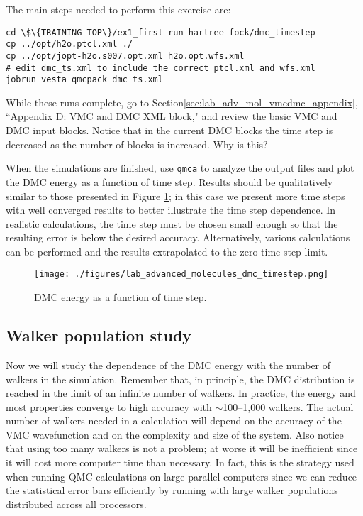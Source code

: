 The main steps needed to perform this exercise are:
\begin{lstlisting}[style=SHELL]
cd \$\{TRAINING TOP\}/ex1_first-run-hartree-fock/dmc_timestep
cp ../opt/h2o.ptcl.xml ./
cp ../opt/jopt-h2o.s007.opt.xml h2o.opt.wfs.xml
# edit dmc_ts.xml to include the correct ptcl.xml and wfs.xml
jobrun_vesta qmcpack dmc_ts.xml
\end{lstlisting}
While these runs complete, go to Section\ref{sec:lab_adv_mol_vmcdmc_appendix}, ``Appendix D: VMC and DMC XML block," and review the basic VMC and DMC input
blocks. Notice that in the current DMC blocks the time step is decreased as the number of blocks is increased. Why is this?

When the simulations are finished, use \texttt{qmca} to analyze the output files and plot the
DMC energy as a function of time step. Results should be qualitatively similar to those
presented in Figure \ref{fig:lam_dmc_timestep}; in this case we present more time steps with well converged results to
better illustrate the time step dependence. In realistic calculations, the time step must be
chosen small enough so that the resulting error is below the desired accuracy. Alternatively,
various calculations can be performed and the results extrapolated to the zero time-step
limit.


\begin{figure}
\begin{center}
\texttt{[image: ./figures/lab\_advanced\_molecules\_dmc\_timestep.png]}
\end{center}
\caption{DMC energy as a function of time step.}
\label{fig:lam_dmc_timestep}
\end{figure}


\subsection{Walker population study}
Now we will study the dependence of the DMC energy with the number of walkers in the
simulation. Remember that, in principle, the DMC distribution is reached in the limit of
an infinite number of walkers. In practice, the energy and most properties converge to high
accuracy with $\sim$100--1,000 walkers. The actual number of walkers needed in a calculation
will depend on the accuracy of the VMC wavefunction and on the complexity and size of
the system. Also notice that using too many walkers is not a problem; at worse it will be
inefficient since it will cost more computer time than necessary. In fact, this is the strategy
used when running QMC calculations on large parallel computers since we can reduce the
statistical error bars efficiently by running with large walker populations distributed across
all processors.

